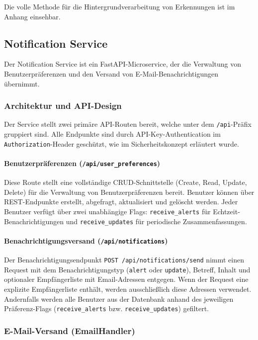 Die volle Methode für die Hintergrundverarbeitung von Erkennungen ist im Anhang einsehbar.


\subsection{Notification Service}

Der Notification Service ist ein FastAPI-Microservice, der die Verwaltung von Benutzerpräferenzen und den Versand von E-Mail-Benachrichtigungen übernimmt.

\subsubsection{Architektur und API-Design}

Der Service stellt zwei primäre API-Routen bereit, welche unter dem \texttt{/api}-Präfix gruppiert sind.
Alle Endpunkte sind durch API-Key-Authentication im \texttt{Authorization}-Header geschützt, wie im Sicherheitskonzept erläutert wurde.

\paragraph{Benutzerpräferenzen (\texttt{/api/user\_preferences})}
Diese Route stellt eine vollständige CRUD-Schnittstelle (Create, Read, Update, Delete) für die Verwaltung von Benutzerpräferenzen bereit.
Benutzer können über REST-Endpunkte erstellt, abgefragt, aktualisiert und gelöscht werden.
Jeder Benutzer verfügt über zwei unabhängige Flags: \texttt{receive\_alerts} für Echtzeit-Benachrichtigungen und \texttt{receive\_updates} für periodische Zusammenfassungen.

\paragraph{Benachrichtigungsversand (\texttt{/api/notifications})}
Der Benachrichtigungsendpunkt \texttt{POST /api/notifications/send} nimmt einen Request mit dem Benachrichtigungstyp (\texttt{alert} oder \texttt{update}), Betreff, Inhalt und optionaler Empfängerliste mit Email-Adressen entgegen.
Wenn der Request eine explizite Empfängerliste enthält, werden ausschließlich diese Adressen verwendet.
Andernfalls werden alle Benutzer aus der Datenbank anhand des jeweiligen Präferenz-Flags (\texttt{receive\_alerts} bzw. \texttt{receive\_updates}) gefiltert.


\subsubsection{E-Mail-Versand (EmailHandler)}

